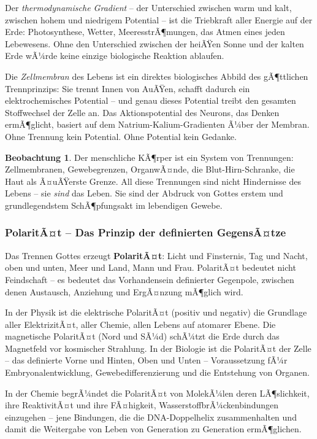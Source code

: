 ﻿\documentclass[a4paper,12pt]{article}
\theoremstyle{definition}
\newtheorem{observation}{Beobachtung}[section]
\begin{document}
Der \textit{thermodynamische Gradient} -- der Unterschied zwischen warm und kalt,
zwischen hohem und niedrigem Potential -- ist die Triebkraft aller Energie auf
der Erde: Photosynthese, Wetter, MeeresstrÃ¶mungen, das Atmen eines jeden Lebewesens.
Ohne den Unterschied zwischen der heiÃŸen Sonne und der kalten Erde wÃ¼rde keine
einzige biologische Reaktion ablaufen.

Die \textit{Zellmembran} des Lebens ist ein direktes biologisches Abbild des
gÃ¶ttlichen Trennprinzips: Sie trennt Innen von AuÃŸen, schafft dadurch ein
elektrochemisches Potential -- und genau dieses Potential treibt den gesamten
Stoffwechsel der Zelle an. Das Aktionspotential des Neurons, das Denken ermÃ¶glicht,
basiert auf dem Natrium-Kalium-Gradienten Ã¼ber der Membran. Ohne Trennung kein
Potential. Ohne Potential kein Gedanke.

\begin{observation}
	Der menschliche KÃ¶rper ist ein System von Trennungen: Zellmembranen, Gewebegrenzen,
	Organ\-wÃ¤nde, die Blut-Hirn-Schranke, die Haut als Ã¤uÃŸerste Grenze. All diese
	Trennungen sind nicht Hindernisse des Lebens -- sie \textit{sind} das Leben.
	Sie sind der Abdruck von Gottes erstem und grundlegendstem SchÃ¶pfungsakt im
	lebendigen Gewebe.
\end{observation}

\subsubsection{PolaritÃ¤t -- Das Prinzip der definierten GegensÃ¤tze}

Das Trennen Gottes erzeugt \textbf{PolaritÃ¤t}: Licht und Finsternis, Tag und
Nacht, oben und unten, Meer und Land, Mann und Frau. PolaritÃ¤t bedeutet nicht
Feindschaft -- es bedeutet das Vorhandensein definierter Gegenpole, zwischen
denen Austausch, Anziehung und ErgÃ¤nzung mÃ¶glich wird.

In der Physik ist die elektrische PolaritÃ¤t (positiv und negativ) die Grundlage
aller ElektrizitÃ¤t, aller Chemie, allen Lebens auf atomarer Ebene. Die magnetische
PolaritÃ¤t (Nord und SÃ¼d) schÃ¼tzt die Erde durch das Magnetfeld vor kosmischer
Strahlung. In der Biologie ist die PolaritÃ¤t der Zelle -- das definierte Vorne
und Hinten, Oben und Unten -- Voraussetzung fÃ¼r Embryonalentwicklung, Gewebedifferenzierung
und die Entstehung von Organen.

In der Chemie begrÃ¼ndet die PolaritÃ¤t von MolekÃ¼len deren LÃ¶slichkeit, ihre
ReaktivitÃ¤t und ihre FÃ¤higkeit, WasserstoffbrÃ¼ckenbindungen einzugehen -- jene
Bindungen, die die DNA-Doppelhelix zusammenhalten und damit die Weitergabe von
Leben von Generation zu Generation ermÃ¶glichen.
\end{document}
